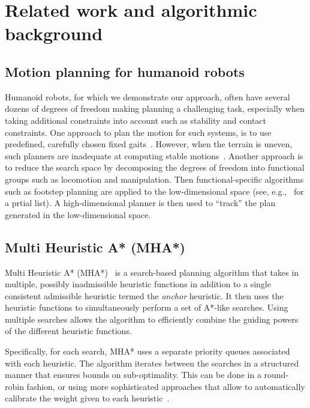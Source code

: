 \documentclass[conference]{IEEEtran}
\begin{document}
\section{Related work and algorithmic background}
\subsection{Motion planning for humanoid robots}
\label{sec:rel}
Humanoid robots, for which we demonstrate our approach, often have several dozens of degrees of freedom making planning a challenging task, especially when taking additional constraints into account such as stability and contact constraints.
One approach to plan the motion for such systems, is to use predefined, carefully chosen fixed gaits~\cite{KKKHKHAI04}. 
However, when the terrain is uneven, such planners are inadequate at computing stable motions~\cite{HBLHW08}.
Another approach is to reduce the search space by decomposing the degrees of freedom into functional groups such as locomotion and manipulation.
Then functional-specific algorithms such as footstep planning are applied to the low-dimensional space (see, e.g.,~\cite{CLCKHK05, KNKII01, PSBLY12, XCXZC09, KKNII02} for a prtial list).
A high-dimensional planner is then used to ``track'' the plan generated in the low-dimensional space.


\subsection{Multi Heuristic A* (MHA*)}
\label{sec:mha}
Multi Heuristic A* (MHA*)~\cite{ASNHL16, NAL15} is a search-based planning algorithm that takes in multiple, possibly inadmissible heuristic functions in addition to a single consistent admissible heuristic termed the \emph{anchor} heuristic.
It then uses the heuristic functions to simultaneously perform a set of A*-like searches.
Using multiple searches allows the algorithm to efficiently combine the guiding powers of the different heuristic functions. 

Specifically, for each search, MHA* uses a separate priority queues associated with each heuristic. 
The algorithm iterates between the searches in a structured manner that ensures bounds on sub-optimality. 
This can be done in a round-robin fashion, or using more 
sophisticated approaches that allow to automatically calibrate the weight given to each heuristic~\cite{PNAL15}.
\end{document}
